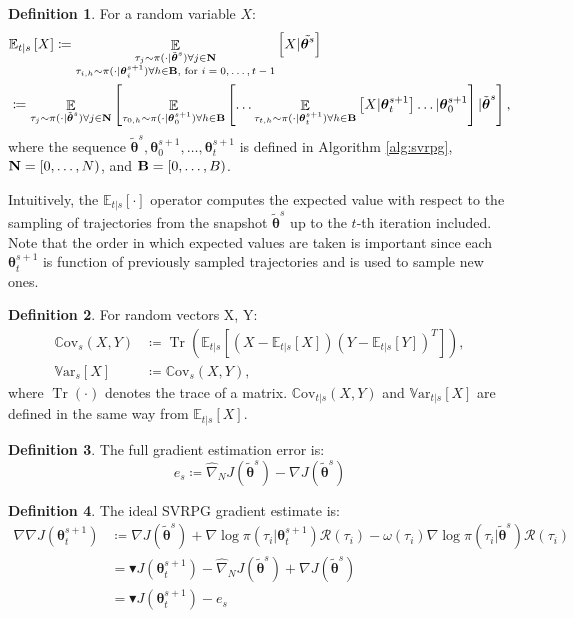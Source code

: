 \documentclass{article}
\theoremstyle{remark}
\theoremstyle{definition}
\newtheorem{definition}{Definition}[section]
\DeclareMathOperator*{\EV}{\mathbb{E}}
\DeclareMathOperator{\Tr}{Tr}
\newcommand{\EVV}[2][\ppvect \in \ppspace]{\EV_{#1}\left[{#2}\right]}
\newcommand{\dnabla}{\nabla\!\!\!\!\nabla}
\newcommand{\vtheta}{\boldsymbol{\theta}}
\newcommand{\Reward}{\mathcal{R}}
\newcommand{\gradJ}[1]{\nabla J(#1)}
\newcommand{\gradApp}[2]{\widehat{\nabla}_{#2}J(#1)}
\newcommand{\Ets}[2][t]{\mathbb{E}_{#1\vert s}\left[#2\right]}
\newcommand{\Covts}[3][t]{{\mathbb{C}\text{ov}}_{#1\vert s}\left(#2,#3\right)}
\newcommand{\Covs}[2]{{\mathbb{C}\text{ov}}_{s}\left(#1,#2\right)}
\newcommand{\Varts}[2][t]{{\mathbb{V}\text{ar}}_{#1\vert s}\left[#2\right]}
\newcommand{\Vars}[1]{{\mathbb{V}\text{ar}}_{s}\left[#1\right]}
\newcommand{\gradBlack}[1]{\blacktriangledown J(#1)}
\newcommand{\gradIdeal}[1]{\dnabla J(#1)}
\begin{document}
\begin{definition}
For a random variable $X$:
\begin{align*}
	&\mathbb{E}_{t\vert s}\left[X\right] \coloneqq 
		\mathop{\mathbb{E}}_{\substack{\tau_j\sim\pi(\cdot\vert\tilde{\vtheta}^s)\forall j \in {\it {\bf N}} \\ \tau_{i,h}\sim\pi(\cdot\vert\vtheta^{s+1}_i) \forall h \in {\it {\bf B}}, \text{ for $i=0,\dots,t-1$}}}{\left[X \vert \tilde{\vtheta^s}\right]} \\
	&\coloneqq \EVV[\tau_j\sim\pi(\cdot\vert\tilde{\vtheta}^s)\forall j \in {\it {\bf N}}]{
			\EVV[\tau_{0,h}\sim\pi(\cdot\vert\vtheta_0^{s+1}) \forall h \in {\it {\bf B}}]
				{\dots
					\EVV[\tau_{t,h}\sim\pi(\cdot\vert\vtheta_t^{s+1})\forall h \in {\it {\bf B}}]
						{X\vert\vtheta_t^{s+1}}
				 \dots
			\vert\vtheta_0^{s+1}}
		\vert\tilde{\vtheta}^s},
\end{align*}
where the sequence $\tilde{\vtheta}^s,\vtheta_0^{s+1},\dots,\vtheta_t^{s+1}$ is defined in Algorithm \ref{alg:svrpg}, ${\it {\bf N}} = [0,\dots,N)$, and ${\it {\bf B}} = [0,\dots,B)$. 
\end{definition}
Intuitively, the $\Ets{\cdot}$ operator computes the expected value with respect to the sampling of trajectories from the snapshot $\tilde{\vtheta}^s$ up to the $t$-th iteration included. Note that the order in which expected values are taken is important since each $\vtheta_{t}^{s+1}$ is function of previously sampled trajectories and is used to sample new ones.

\begin{definition}
For random vectors X, Y:
\begin{align*}
	\Covs{X}{Y} &\coloneqq \Tr\left(\Ets{(X-\Ets{X})(Y-\Ets{Y})^T}\right), \\
	\Vars{X} &\coloneqq \Covs{X}{Y},
\end{align*}
where $\Tr(\cdot)$ denotes the trace of a matrix. $\Covts[t]{X}{Y}$ and $\Varts[t]{X}$ are defined in the same way from $\Ets[t]{X}$.
\end{definition}

\begin{definition}
The full gradient estimation error is:
\[
	e_s \coloneqq \gradApp{\tilde{\vtheta}^s}{N} - \gradJ{\tilde{\vtheta}^s} 
\]
\end{definition}

\begin{definition}\label{def:ideal}
The ideal SVRPG gradient estimate is:
\begin{align*}
	\gradIdeal{\vtheta_t^{s+1}} &\coloneqq 
	\gradJ{\tilde{\vtheta}^s}
	+ \nabla\log\pi(\tau_i \vert \vtheta_t^{s+1})\Reward(\tau_i) 
	- \omega(\tau_i)\nabla\log\pi(\tau_i \vert \tilde{\vtheta}^s)\Reward(\tau_i) \\
	&= \gradBlack{\vtheta_t^{s+1}} - \gradApp{\tilde{\vtheta}^s}{N} + \gradJ{\tilde{\vtheta}^s} \\
	&= \gradBlack{\vtheta_t^{s+1}} - e_s
\end{align*}
\end{definition}
\end{document}
